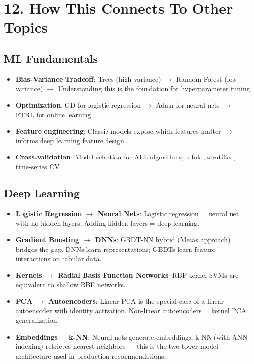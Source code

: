 \documentclass[11pt]{article}
\providecommand{\tightlist}{\setlength{\itemsep}{1pt}\setlength{\parskip}{0pt}}
\begin{document}
\section{12. How This Connects To Other Topics}\label{12-how-this-connects-to-other-topics}

\subsection{ML Fundamentals}\label{ml-fundamentals}

\begin{itemize}
\tightlist
\item
  \textbf{Bias-Variance Tradeoff}: Trees (high variance) \(\rightarrow\) Random Forest (low variance) \(\rightarrow\) Understanding this is the foundation for hyperparameter tuning
\item
  \textbf{Optimization}: GD for logistic regression \(\rightarrow\) Adam for neural nets \(\rightarrow\) FTRL for online learning
\item
  \textbf{Feature engineering}: Classic models expose which features matter \(\rightarrow\) informs deep learning feature design
\item
  \textbf{Cross-validation}: Model selection for ALL algorithms; k-fold, stratified, time-series CV
\end{itemize}

\subsection{Deep Learning}\label{deep-learning}

\begin{itemize}
\tightlist
\item
  \textbf{Logistic Regression \(\rightarrow\) Neural Nets}: Logistic regression = neural net with no hidden layers. Adding hidden layers = deep learning.
\item
  \textbf{Gradient Boosting \(\rightarrow\) DNNs}: GBDT-NN hybrid (Meta\textquotesingle s approach) bridges the gap. DNNs learn representations; GBDTs learn feature interactions on tabular data.
\item
  \textbf{Kernels \(\rightarrow\) Radial Basis Function Networks}: RBF kernel SVMs are equivalent to shallow RBF networks.
\item
  \textbf{PCA \(\rightarrow\) Autoencoders}: Linear PCA is the special case of a linear autoencoder with identity activation. Non-linear autoencoders = kernel PCA generalization.
\item
  \textbf{Embeddings + k-NN}: Neural nets generate embeddings, k-NN (with ANN indexing) retrieves nearest neighbors --- this is the two-tower model architecture used in production recommendations.
\end{itemize}
\end{document}
